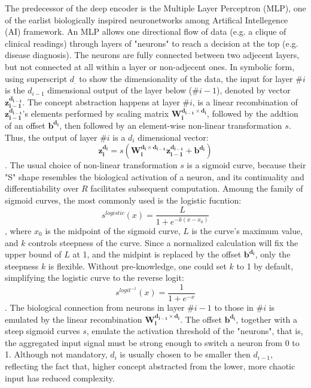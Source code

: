 \documentclass[twocolumn]{article}
\begin{document}
The predecessor of the deep encoder is the Multiple Layer Perceptron (MLP), one of the earlist biologically inspired neuronetworks among Artifical Intellegence (AI) framework. An MLP allows one directional flow of data (e.g. a clique of clinical readings) through layers of "neurons" to reach a decision at the top (e.g. disease diagnosis). The neurons are fully connected between two adjecent layers, but not connected at all within a layer or non-adjecent ones. In symbolic form, using superscript $d_.$ to show the dimensionality of the data, the input for layer $\#i$ is the $d_{i-1}$ dimensional output of the layer below ($\#i-1$), denoted by vector $\boldsymbol{z_{i-1}^{d_{i-1}}}$.  The concept abstraction happens at layer $\#i$, is a linear recombination of $\boldsymbol{z_{i-1}^{d_{i-1}}}$'s elements performed by scaling matrix $\boldsymbol{W_i^{d_{i-1}\times d_i}}$, followed by the addtion of an offset $\boldsymbol{b^{d_i}}$, then followed by an element-wise non-linear transformation $s$. Thus, the output of layer $\#i$ is a $d_i$ dimensional vector:
\[ \boldsymbol{z_i^{d_i}} = s(\boldsymbol{W_i^{d_i\times d_{i-1}}z_{i-1}^{d_{i-1}}}+\boldsymbol{b^{d_i}})\].
The usual choice of non-linear transformation $s$ is a sigmoid curve, because their "S" shape resembles the biological activation of a neuron, and its continuality and differentiability over $R$ facilitates subsequent computation. Amoung the family of sigmoid curves, the most commonly used is the logistic fucntion: 
\[s^{logistic}(x)=\frac{L}{1+e^{-k(x-x_0)}}\],
where $x_0$ is the midpoint of the sigmoid curve, $L$ is the curve's maximum value, and $k$ controls steepness of the curve. Since a normalized calculation will fix the upper bound of $L$ at 1, and the midpint is replaced by the offset $\boldsymbol{b^{d_i}}$, only the steepness $k$ is flexible. Without pre-knowledge, one could set $k$ to 1 by default, simplifying the logistic curve to the reverse logit: 
\[s^{logit^{-1}}(x)=\frac{1}{1+e^{-x}}\].
The biological connection from neurons in layer $\#i-1$ to those in $\#i$ is emulated by the linear recombination $\boldsymbol{W_i^{d_{i-1} \times d_i}}$. The offset $\boldsymbol{b^{d_i}}$, together with a steep sigmoid curves $s$, emulate the activation threshold of the "neurons", that is, the aggregated input signal must be strong enough to switch a neuron from 0 to 1.
Although not mandatory, $d_i$ is usually chosen to be smaller then $d_{i-1}$, reflecting the fact that, higher concept abstracted from the lower, more chaotic input has reduced complexity. 
\end{document}

